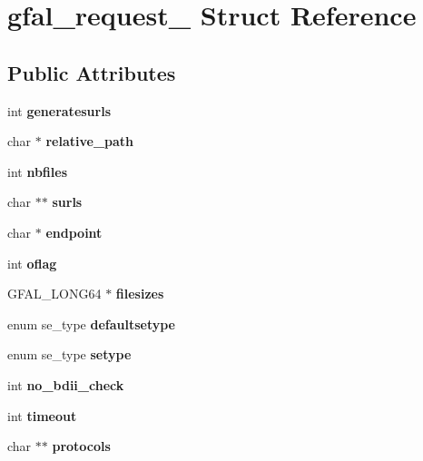 \section{gfal\_\-request\_\- Struct Reference}
\label{structgfal__request__}
\subsection*{Public Attributes}
\begin{DoxyCompactItemize}
\item 
int {\bfseries generatesurls}\label{structgfal__request___a56d51b9ccaf56c876162084ffd3520e4}

\item 
char $\ast$ {\bfseries relative\_\-path}\label{structgfal__request___a825cb43e3a792cccc55214371d2f016c}

\item 
int {\bfseries nbfiles}\label{structgfal__request___a2ee6a53bb577e0811276ef43ce625cfc}

\item 
char $\ast$$\ast$ {\bfseries surls}\label{structgfal__request___a45f6993acd387b4deb9503ee3a2dda91}

\item 
char $\ast$ {\bfseries endpoint}\label{structgfal__request___a0c851d244540907da45a51c179f70018}

\item 
int {\bfseries oflag}\label{structgfal__request___ad4a5f1d18057c3e8ed59e91315b00f89}

\item 
GFAL\_\-LONG64 $\ast$ {\bfseries filesizes}\label{structgfal__request___ae3c83387efc19542dc52a9dd671fc21f}

\item 
enum se\_\-type {\bfseries defaultsetype}\label{structgfal__request___ad3deeaf30addc80d93b0a378761258aa}

\item 
enum se\_\-type {\bfseries setype}\label{structgfal__request___a1c4425eff56c2a6b63a5f94d646187f5}

\item 
int {\bfseries no\_\-bdii\_\-check}\label{structgfal__request___ad76bc22272d860adda338017e764ba25}

\item 
int {\bfseries timeout}\label{structgfal__request___acf5a7422e6ff02b37050be68e289fbf7}

\item 
char $\ast$$\ast$ {\bfseries protocols}\label{structgfal__request___ae8be9ccba72ced33cb68b2f142870aae}


\end{DoxyCompactItemize}
